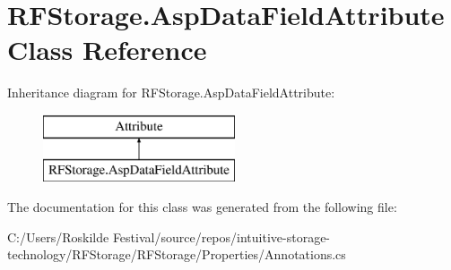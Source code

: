 \hypertarget{class_r_f_storage_1_1_asp_data_field_attribute}{}\section{R\+F\+Storage.\+Asp\+Data\+Field\+Attribute Class Reference}
\label{class_r_f_storage_1_1_asp_data_field_attribute}
Inheritance diagram for R\+F\+Storage.\+Asp\+Data\+Field\+Attribute\+:\begin{figure}[H]
\begin{center}
\leavevmode
\includegraphics[height=2.000000cm]{class_r_f_storage_1_1_asp_data_field_attribute}
\end{center}
\end{figure}


The documentation for this class was generated from the following file\+:\begin{DoxyCompactItemize}
\item 
C\+:/\+Users/\+Roskilde Festival/source/repos/intuitive-\/storage-\/technology/\+R\+F\+Storage/\+R\+F\+Storage/\+Properties/Annotations.\+cs\end{DoxyCompactItemize}
